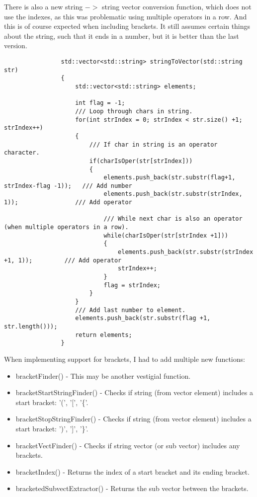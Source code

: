 \documentclass{article}
\begin{document}
			There is also a new string $->$ string vector conversion function, which does not use the indexes, as this was problematic using multiple operators in a row. And this is of course expected when including brackets. It still assumes certain things about the string, such that it ends in a number, but it is better than the last version.
			\begin{lstlisting}
				std::vector<std::string> stringToVector(std::string str)
				{
					std::vector<std::string> elements;
					
					int flag = -1;
					/// Loop through chars in string.
					for(int strIndex = 0; strIndex < str.size() +1; strIndex++)
					{
						/// If char in string is an operator character.
						if(charIsOper(str[strIndex]))
						{
							elements.push_back(str.substr(flag+1, strIndex-flag -1)); 	/// Add number
							elements.push_back(str.substr(strIndex, 1));                /// Add operator
							
							/// While next char is also an operator (when multiple operators in a row).
							while(charIsOper(str[strIndex +1]))
							{
								elements.push_back(str.substr(strIndex +1, 1));    		/// Add operator
								strIndex++;
							}
							flag = strIndex;
						}
					}
					/// Add last number to element.
					elements.push_back(str.substr(flag +1, str.length()));
					return elements;
				}
			\end{lstlisting}
			
			When implementing support for brackets, I had to add multiple new functions:
			\begin{itemize}
				\item bracketFinder()				- This may be another vestigial function.
				\item bracketStartStringFinder()	- Checks if string (from vector element) includes a start bracket: '(', '[', '\{'.
				\item bracketStopStringFinder()		- Checks if string (from vector element) includes a start bracket: ')', ']', '\}'.
				\item bracketVectFinder()			- Checks if string vector (or sub vector) includes any brackets.
				\item bracketIndex()				- Returns the index of a start bracket and its ending bracket.
				\item bracketedSubvectExtractor()	- Returns the sub vector between the brackets.
			\end{itemize}
			
\end{document}
